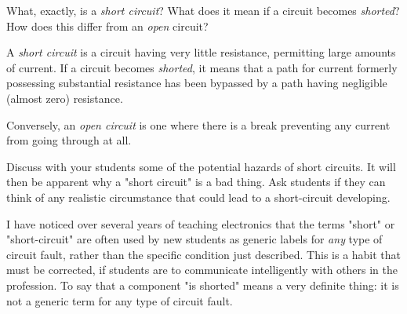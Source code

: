 

What, exactly, is a {\it short circuit}?  What does it mean if a circuit becomes {\it shorted}?  How does this differ from an {\it open} circuit?







A {\it short circuit} is a circuit having very little resistance, permitting large amounts of current.  If a circuit becomes {\it shorted}, it means that a path for current formerly possessing substantial resistance has been bypassed by a path having negligible (almost zero) resistance.

\vskip 10pt

Conversely, an {\it open circuit} is one where there is a break preventing any current from going through at all.







Discuss with your students some of the potential hazards of short circuits.  It will then be apparent why a "short circuit" is a bad thing.  Ask students if they can think of any realistic circumstance that could lead to a short-circuit developing.

I have noticed over several years of teaching electronics that the terms "short" or "short-circuit" are often used by new students as generic labels for {\it any} type of circuit fault, rather than the specific condition just described.  This is a habit that must be corrected, if students are to communicate intelligently with others in the profession.  To say that a component "is shorted" means a very definite thing: it is not a generic term for any type of circuit fault.




